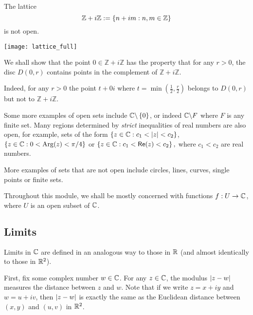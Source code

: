 \begin{example} 
The lattice
\[
\mathbb{Z} + i\mathbb{Z} : = \left\{ n + im: n,m \in \mathbb{Z} \right\}
\]
is not open.
\begin{center}
\texttt{[image: lattice\_full]}
\end{center}

We shall show that the point $0 \in \mathbb{Z}+i \mathbb{Z}$ has the property that for any $r>0$, the disc $D(0,r)$ contains points in the complement of $\mathbb{Z}+i \mathbb{Z}$.

Indeed, for any $r>0$ the point $t+0i$ where $t=\min ( \frac{1}{2} , \frac{r}{2} )$ belongs to $D(0,r)$ but not to $\mathbb{Z}+i\mathbb{Z}$.

\end{example}


\begin{note}
Some more examples of open sets include $\mathbb{C} \backslash \left\{0\right\}$, or indeed $\mathbb{C} \backslash F$ where $F$ is any finite set.  Many regions determined by \emph{strict} inequalities of real numbers are also open, for example, sets of the form
$
\left\{ z \in \mathbb{C}: c_1<\left| z \right|<c_2 \right\}$, $\left\{ z \in \mathbb{C}: 0 < \mathrm{Arg} (z) < \pi/4 \right\}$ or $\left\{z \in \mathbb{C}: c_1<\textsf{Re}(z) < c_2 \right\},$
where $c_1<c_2 $ are real numbers.

More examples of sets that are not open include circles, lines, curves, single points or finite sets.
\end{note}
Throughout this module, we shall be mostly concerned with functions $f:U \to \mathbb{C}$, where $U$ is an open subset of $\mathbb{C}$.  

 
\subsection{Limits}
Limits in $\mathbb{C}$ are defined in an analogous way to those in $\mathbb{R}$ (and almost identically to those in $\mathbb{R}^2$). 

First, fix some complex number $w \in \mathbb{C}$.  For any $z \in \mathbb{C}$, the modulus $\left| z-w \right|$ measures the distance between $z$ and $w$.  Note that if we write $z=x+iy$ and $w=u+iv$, then $\left| z-w \right|$ is exactly the same as the Euclidean distance between $(x,y)$ and $(u,v)$ in $\mathbb{R}^2$.




